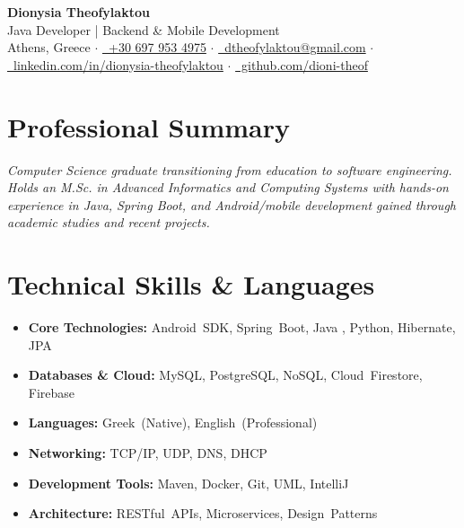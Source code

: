 \documentclass[a4paper,11pt]{article}
\begin{document}
\begin{center}
    {\Huge\bfseries\color{primary} Dionysia Theofylaktou}\\[0.15em]
    {\large\color{secondary} Java Developer | Backend \& Mobile Development}\\[0.25em]
    \textcolor{secondary}{
        Athens, Greece $\cdot$
        \href{tel:+306979534975}{\faPhone~+30 697 953 4975} $\cdot$
        \href{mailto:dtheofylaktou@gmail.com}{\faEnvelope~dtheofylaktou@gmail.com} $\cdot$
        \href{https://www.linkedin.com/in/dionysia-theofylaktou/}{\faLinkedin~linkedin.com/in/dionysia-theofylaktou} $\cdot$
        \href{https://github.com/dioni-theof}{\faGithub~github.com/dioni-theof}
    }
\end{center}

\vspace{0.15em}

\section*{Professional Summary}
\textit{Computer Science graduate transitioning from education to software engineering. Holds an M.Sc. in Advanced Informatics and Computing Systems with hands-on experience in Java, Spring Boot, and Android/mobile development gained through academic studies and recent projects.}

\vspace{0.2em}

\section*{Technical Skills \& Languages}
\noindent
\begin{minipage}[t]{0.49\textwidth}
\begin{itemize}[leftmargin=*, noitemsep, topsep=0pt, parsep=1pt, partopsep=0pt]
    \item \textbf{Core Technologies:} Android~SDK, Spring~Boot, Java , Python, Hibernate, JPA
    \item \textbf{{Databases \& Cloud:}} MySQL, PostgreSQL, NoSQL, Cloud~Firestore, Firebase
    \item \textbf{{Languages:}} Greek~(Native), English~(Professional)
\end{itemize}
\end{minipage}\hfill
\begin{minipage}[t]{0.49\textwidth}
\begin{itemize}[leftmargin=*, noitemsep, topsep=0pt, parsep=1pt, partopsep=0pt]
    \item \textbf{{Networking:}} TCP/IP, UDP, DNS, DHCP
    \item \textbf{{Development Tools:}} Maven, Docker, Git, UML, IntelliJ
    \item \textbf{{Architecture:}} RESTful~APIs, Microservices, Design~Patterns
\end{itemize}
\end{minipage}
\end{document}
